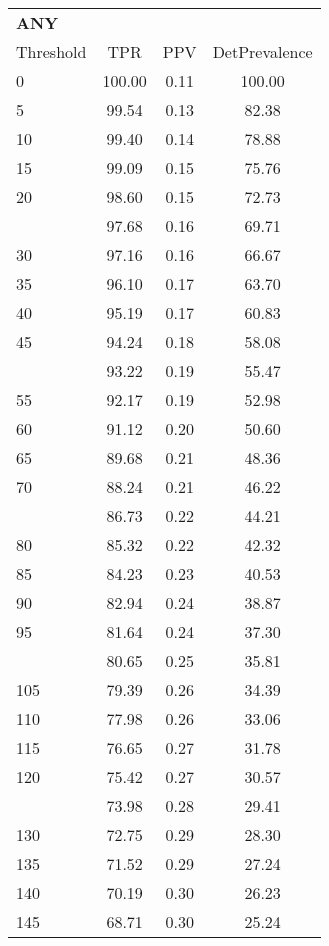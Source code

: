 \begin{table}[ht]
\centering\scriptsize
\begin{tabular}{lccc}
  \toprule
  \multicolumn{4}{l}{\textbf{ANY}}\\
Threshold & TPR & PPV & DetPrevalence \\ 
  \midrule
0 & 100.00 & 0.11 & 100.00 \\ 
  5 & 99.54 & 0.13 & 82.38 \\ 
  10 & 99.40 & 0.14 & 78.88 \\ 
  15 & 99.09 & 0.15 & 75.76 \\ 
  20 & 98.60 & 0.15 & 72.73 \\ 
   \addlinespace
25 & 97.68 & 0.16 & 69.71 \\ 
  30 & 97.16 & 0.16 & 66.67 \\ 
  35 & 96.10 & 0.17 & 63.70 \\ 
  40 & 95.19 & 0.17 & 60.83 \\ 
  45 & 94.24 & 0.18 & 58.08 \\ 
   \addlinespace
50 & 93.22 & 0.19 & 55.47 \\ 
  55 & 92.17 & 0.19 & 52.98 \\ 
  60 & 91.12 & 0.20 & 50.60 \\ 
  65 & 89.68 & 0.21 & 48.36 \\ 
  70 & 88.24 & 0.21 & 46.22 \\ 
   \addlinespace
75 & 86.73 & 0.22 & 44.21 \\ 
  80 & 85.32 & 0.22 & 42.32 \\ 
  85 & 84.23 & 0.23 & 40.53 \\ 
  90 & 82.94 & 0.24 & 38.87 \\ 
  95 & 81.64 & 0.24 & 37.30 \\ 
   \addlinespace
100 & 80.65 & 0.25 & 35.81 \\ 
  105 & 79.39 & 0.26 & 34.39 \\ 
  110 & 77.98 & 0.26 & 33.06 \\ 
  115 & 76.65 & 0.27 & 31.78 \\ 
  120 & 75.42 & 0.27 & 30.57 \\ 
   \addlinespace
125 & 73.98 & 0.28 & 29.41 \\ 
  130 & 72.75 & 0.29 & 28.30 \\ 
  135 & 71.52 & 0.29 & 27.24 \\ 
  140 & 70.19 & 0.30 & 26.23 \\ 
  145 & 68.71 & 0.30 & 25.24 \\ 

\end{tabular}
\end{table}
